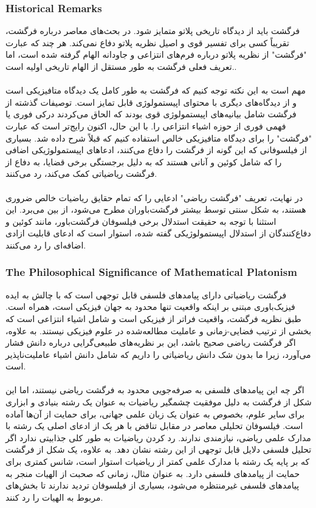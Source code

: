 \documentclass[10pt,a4paper]{article}
\begin{document}
                    \subsubsection{Historical Remarks}
فرگشت باید از دیدگاه تاریخی پلاتو متمایز شود. در بحث‌های معاصر درباره فرگشت، تقریباً کسی برای تفسیر قوی و اصیل نظریه پلاتو دفاع نمی‌کند. هر چند که عبارت "فرگشت" از نظریه پلاتو درباره فرم‌های انتزاعی و جاودانه الهام گرفته شده است، اما تعریف فعلی فرگشت به طور مستقل از الهام تاریخی اولیه است..\cite{sep-platonism-mathematics}
                        \\
                        \\
مهم است به این نکته توجه کنیم که فرگشت به طور کامل یک دیدگاه متافیزیکی است و از دیدگاه‌های دیگری با محتوای اپیستمولوژی قابل تمایز است. توصیفات گذشته از فرگشت شامل بیانیه‌های اپیستمولوژی قوی بودند که الحاق می‌کردند درکی فوری یا فهمی فوری از حوزه اشیاء انتزاعی را. با این حال، اکنون رایج‌تر است که عبارت "فرگشت" را برای دیدگاه متافیزیکی خالص استفاده کنیم که قبلاً شرح داده شد. بسیاری از فیلسوفانی که این گونه از فرگشت را دفاع می‌کنند، ادعاهای اپیستمولوژیکی اضافی را که شامل کوئین و آنانی هستند که به دلیل برجستگی برخی قضایا، به دفاع از فرگشت ریاضیاتی کمک می‌کند، رد می‌کنند.
                        \\
                        \\
در نهایت، تعریف "فرگشت ریاضی" ادعایی را که تمام حقایق ریاضیات خالص ضروری هستند، به شکل سنتی توسط بیشتر فرگشت‌باوران مطرح می‌شود، از بین می‌برد. این استثنا با توجه به حقیقت استدلال برخی فیلسوفان فرگشت‌باور، مانند کوئین و دفاع‌کنندگان از استدلال اپیستمولوژیکی گفته شده، استوار است که ادعای قابلیت ازادی اضافه‌ای را رد می‌کنند.
                    \subsubsection{The Philosophical Significance of Mathematical Platonism}
فرگشت ریاضیاتی دارای پیامدهای فلسفی قابل توجهی است که با چالش به ایده فیزیک‌باوری مبتنی بر اینکه واقعیت تنها محدود به جهان فیزیکی است، همراه است. طبق نظریه فرگشت، واقعیت فراتر از فیزیکی است و شامل اشیاء انتزاعی است که بخشی از ترتیب فضایی-زمانی و عاملیت مطالعه‌شده در علوم فیزیکی نیستند. به علاوه، اگر فرگشت ریاضی صحیح باشد، این بر نظریه‌های طبیعی‌گرایی درباره دانش فشار می‌آورد، زیرا ما بدون شک دانش ریاضیاتی را داریم که شامل دانش اشیاء عاملیت‌ناپذیر است.
                        \\
                        \\
اگر چه این پیامدهای فلسفی به صرفه‌جویی محدود به فرگشت ریاضی نیستند، اما این شکل از فرگشت به دلیل موفقیت چشمگیر ریاضیات به عنوان یک رشته بنیادی و ابزاری برای سایر علوم، بخصوص به عنوان یک زبان علمی جهانی، برای حمایت از آن‌ها آماده است. فیلسوفان تحلیلی معاصر در مقابل تناقض با هر یک از ادعای اصلی یک رشته با مدارک علمی ریاضی، نیازمندی ندارند. رد کردن ریاضیات به طور کلی جذابیتی ندارد اگر تحلیل فلسفی دلایل قابل توجهی از این رشته نشان دهد. به علاوه، یک شکل از فرگشت که بر پایه یک رشته با مدارک علمی کمتر از ریاضیات استوار است، شانس کمتری برای حمایت از پیامدهای فلسفی دارد. به عنوان مثال، زمانی که صحبت از الهیات منجر به پیامدهای فلسفی غیرمنتظره می‌شود، بسیاری از فیلسوفان تردید ندارند تا بخش‌های مربوط به الهیات را رد کنند.
\end{document}
